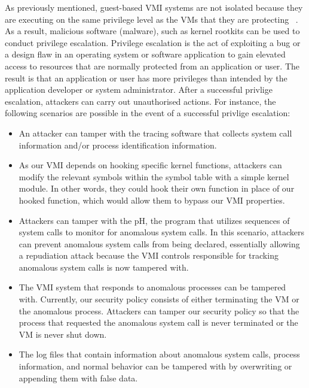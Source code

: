 \documentclass{report}
\begin{document}
\begin{spacing}{1.5}
{\large
\noindent As previously mentioned, guest-based VMI systems are not isolated because they are executing on the same privilege level as the VMs that they are protecting ~\cite{10.1145/2775111}. As a result, malicious software (malware), such as kernel rootkits can be used to conduct privilege escalation. Privilege escalation is the act of exploiting a bug or a design flaw in an operating system or software application to gain elevated access to resources that are normally protected from an application or user. The result is that an application or user has more privileges than intended by the application developer or system administrator. After a successful privlige escalation, attackers can carry out unauthorised actions. For instance, the following scenarios are possible in the event of a successful privlige escalation:
\newline
}



{\large
\begin{itemize}
\item An attacker can tamper with the tracing software that collects system call information and/or process identification information. 

\item As our VMI depends on hooking specific kernel functions, attackers can modify the relevant symbols within the symbol table with a simple kernel module. In other words, they could hook their own function in place of our hooked function, which would allow them to bypass our VMI properties.

\item Attackers can tamper with the pH, the program that utilizes sequences of system calls to monitor for anomalous system calls. In this scenario, attackers can prevent anomalous system calls from being declared, essentially allowing a repudiation attack because the VMI controls responsible for tracking anomalous system calls is now tampered with.

\item The VMI system that responds to anomalous processes can be tampered with. Currently, our security policy consists of either terminating the VM or the anomalous process. Attackers can tamper our security policy so that the process that requested the anomalous system call is never terminated or the VM is never shut down.

\item The log files that contain information about anomalous system calls, process information, and normal behavior can be tampered with by overwriting or appending them with false data. 
\end{itemize}
}


\end{spacing}
\end{document}
